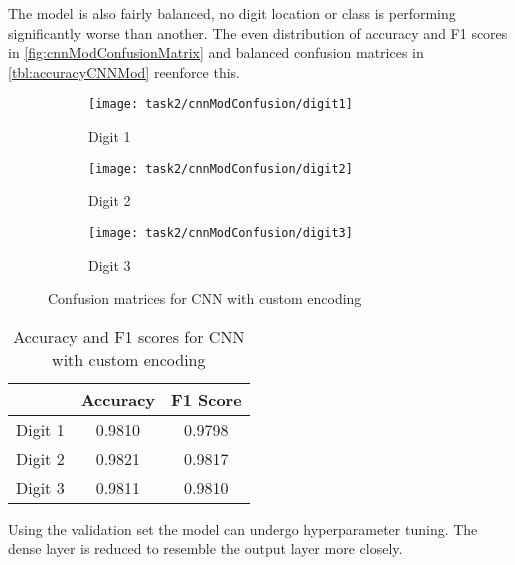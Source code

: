The model is also fairly balanced, no digit location or class is performing significantly worse than another. The even distribution of accuracy and F1 scores in \autoref{fig:cnnModConfusionMatrix} and balanced confusion matrices in \autoref{tbl:accuracyCNNMod} reenforce this.

\begin{figure}[!htbp]
    \centering
    \begin{subfigure}{0.3\textwidth}
        \texttt{[image: task2/cnnModConfusion/digit1]}
        \caption{Digit 1}
        \label{fig:cnnModConfusionMatrix1}
    \end{subfigure}
    \begin{subfigure}{0.3\textwidth}
        \texttt{[image: task2/cnnModConfusion/digit2]}
        \caption{Digit 2}
        \label{fig:cnnModConfusionMatrix2}
    \end{subfigure}
    \begin{subfigure}{0.3\textwidth}
        \texttt{[image: task2/cnnModConfusion/digit3]}
        \caption{Digit 3}
        \label{fig:cnnModConfusionMatrix3}
    \end{subfigure}
    \caption{Confusion matrices for CNN with custom encoding}
    \label{fig:cnnModConfusionMatrix}
\end{figure}

\bgroup
    \begin{table}[!htbp]
        \centering
        \begin{tabular}{l|cc}
            \hline
            & Accuracy & F1 Score \\ \hline
            Digit 1 & 0.9810 & 0.9798 \\
            Digit 2 & 0.9821 & 0.9817 \\ 
            Digit 3 & 0.9811 & 0.9810 \\
        \end{tabular}
        \caption{Accuracy and F1 scores for CNN with custom encoding}
        \label{tbl:accuracyCNNMod}
    \end{table}
\egroup

Using the validation set the model can undergo hyperparameter tuning. The dense layer is reduced to resemble the output layer more closely.

